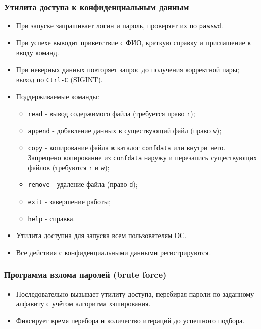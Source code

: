 \documentclass[areasetadvanced]{scrartcl}
\begin{document}
\subsubsection{Утилита доступа к конфиденциальным данным}
\begin{itemize}
    \item При запуске запрашивает логин и пароль, проверяет их по \texttt{passwd}.
    \item При успехе выводит приветствие с ФИО, краткую справку и приглашение к вводу команд.
    \item При неверных данных повторяет запрос до получения корректной пары; выход по \texttt{Ctrl-C} (SIGINT).
    \item Поддерживаемые команды:
    \begin{itemize}
        \item \texttt{read} - вывод содержимого файла (требуется право \texttt{r});
        \item \texttt{append} - добавление данных в существующий файл (право \texttt{w});
        \item \texttt{copy} - копирование файла \textbf{в} каталог \texttt{confdata} или внутри него. Запрещено копирование из \texttt{confdata} наружу и перезапись существующих файлов (требуются \texttt{r} и \texttt{w});
        \item \texttt{remove} - удаление файла (право \texttt{d});
        \item \texttt{exit} - завершение работы;
        \item \texttt{help} - справка.
    \end{itemize}
    \item Утилита доступна для запуска всем пользователям ОС.
    \item Все действия с конфиденциальными данными регистрируются.
\end{itemize}

\subsubsection{Программа взлома паролей (brute force)}
\begin{itemize}
    \item Последовательно вызывает утилиту доступа, перебирая пароли по заданному алфавиту с учётом алгоритма хэширования.
    \item Фиксирует время перебора и количество итераций до успешного подбора.
\end{itemize}
\end{document}
